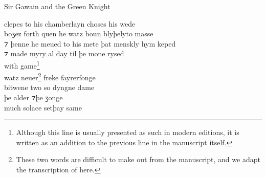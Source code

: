 \begin{texts}{Sir Gawain and the Green Knight}
\begin{textglossed}
    clepes to his chamberlayn choses his wede\\
    boʒez forth quen he watz boun blyþelyto masse\\
    ⁊ þenne he meued to his mete þat menskly hym keped\\
    ⁊ made myry al day til þe mone rysed\\
    with game\footnote{Although this line is usually presented as such in modern editions, it is written as an addition to the previous line in the manuscript itself.}\\
    watz neuer\footnote{These two words are difficult to make out from the manuscript, and we adapt the transcription of \citet{TolkienGordon1967} here.} freke fayrerfonge\\
    bitwene two so dyngne dame\\
    þe alder ⁊þe ʒonge\\
    much solace setþay same
\end{textglossed}


\end{texts}

